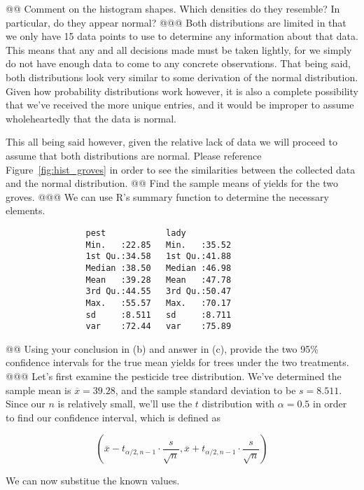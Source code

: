 \documentclass[10pt]{article}
\begin{document}
\begin{easylist}[enumerate]
    @@ Comment on the histogram shapes. Which densities do they resemble? In particular, do they appear normal?
    @@@ Both distributions are limited in that we only have 15 data points to use to determine any information about
    that data. This means that any and all decisions made must be taken lightly, for we simply do not have enough data
    to come to any concrete observations. That being said, both distributions look very similar to some derivation of
    the normal distribution. Given how probability distributions work however, it is also a complete possibility that
    we've received the more unique entries, and it would be improper to assume wholeheartedly that the data is
    normal.\newline

    This all being said however, given the relative lack of data we will proceed to assume that both distributions are
    normal. Please reference Figure~\ref{fig:hist_groves} in order to see the similarities between the collected data
    and the normal distribution.
    @@ Find the sample means of yields for the two groves.
    @@@ We can use {\ttfamily R}'s summary function to determine the necessary elements.

        \begin{verbatim}
                pest            lady
                Min.   :22.85   Min.   :35.52
                1st Qu.:34.58   1st Qu.:41.88
                Median :38.50   Median :46.98
                Mean   :39.28   Mean   :47.78
                3rd Qu.:44.55   3rd Qu.:50.47
                Max.   :55.57   Max.   :70.17
                sd     :8.511   sd     :8.711
                var    :72.44   var    :75.89
        \end{verbatim}

    @@ Using your conclusion in (b) and answer in (c), provide the two 95\% confidence intervals for the true mean
    yields for trees under the two treatments.
    @@@ Let's first examine the pesticide tree distribution. We've determined the sample mean is $\overline{x} = 39.28$,
    and the sample standard deviation to be $s = 8.511$. Since our $n$ is relatively small, we'll use the $t$
    distribution with $\alpha = 0.5$ in order to find our confidence interval, which is defined as

    \[
        \left( \overline{x} - t_{\alpha/2,n-1} \cdot \frac{s}{\sqrt{n}},
        \overline{x} + t_{\alpha/2,n-1} \cdot \frac{s}{\sqrt{n}} \right)
    \]

    We can now substitue the known values.


\end{easylist}
\end{document}
